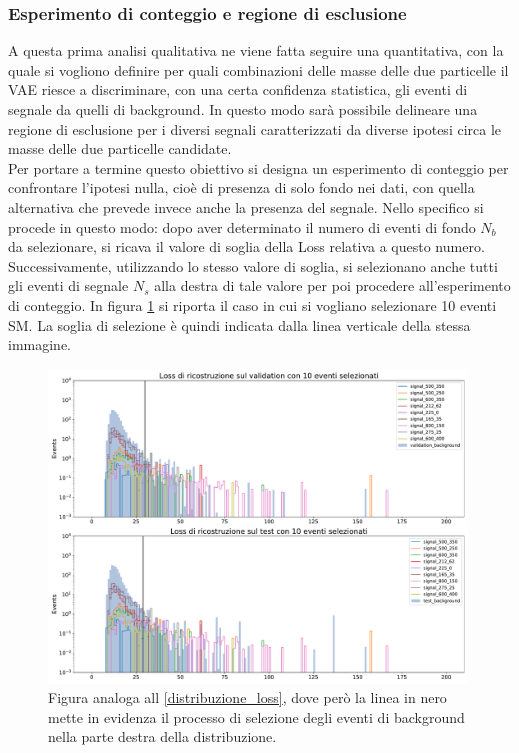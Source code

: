 \newpage


\subsubsection{Esperimento di conteggio e regione di esclusione}
\label{esperimento di conteggio e regione di esclusione}

A questa prima analisi qualitativa ne viene fatta seguire una quantitativa, con la quale si vogliono definire per quali combinazioni delle masse delle due particelle il VAE riesce a discriminare, con una certa confidenza statistica, gli eventi di segnale da quelli di background. In questo modo sarà possibile delineare una regione di esclusione per i diversi segnali caratterizzati da diverse ipotesi circa le masse delle due particelle candidate.\\
Per portare a termine questo obiettivo si designa un esperimento di conteggio per confrontare l'ipotesi nulla, cioè di presenza di solo fondo nei dati, con quella alternativa che prevede invece anche la presenza del segnale. Nello specifico si procede in questo modo: dopo aver determinato il numero di eventi di fondo $N_b$ da selezionare, si ricava il valore di soglia della Loss relativa a questo numero. Successivamente, utilizzando lo stesso valore di soglia, si selezionano anche tutti gli eventi di segnale $N_s$ alla destra di tale valore per poi procedere all'esperimento di conteggio. In figura \ref{distribuzioneLossRiga} si riporta il caso in cui si vogliano selezionare 10 eventi SM. La soglia di selezione è quindi indicata dalla linea verticale della stessa immagine.

\begin{figure}[h!]
	\centering
	\includegraphics[width=0.99\textwidth]{figs/risultati_simulazione/distribuzioneLossRiga.pdf}
	\caption{Figura analoga all \ref{distribuzione_loss}, dove però la linea in nero mette in evidenza il processo di selezione degli eventi di background nella parte destra della distribuzione.}
	\label{distribuzioneLossRiga}
\end{figure}

